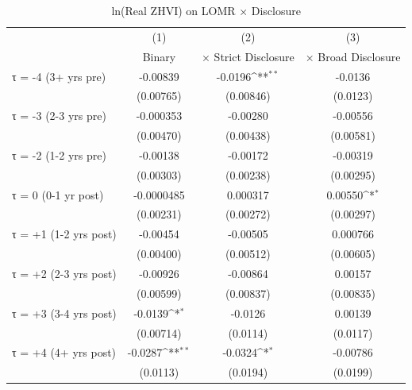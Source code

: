\begin{table}[htbp]\centering\scriptsize
\def\sym#1{\ifmmode^{#1}\else\(^{#1}\)\fi}
\caption{ln(Real ZHVI) on LOMR × Disclosure}
\label{tab:disclosure}
\begin{tabular}{l*{3}{c}}
\hline\hline
                    &\multicolumn{1}{c}{(1)}&\multicolumn{1}{c}{(2)}&\multicolumn{1}{c}{(3)}\\
                    &\multicolumn{1}{c}{Binary}&\multicolumn{1}{c}{× Strict Disclosure}&\multicolumn{1}{c}{× Broad Disclosure}\\
\hline
τ = -4 (3+ yrs pre) &    -0.00839         &     -0.0196\sym{**} &     -0.0136         \\
                    &   (0.00765)         &   (0.00846)         &    (0.0123)         \\
[0.15em]
τ = -3 (2-3 yrs pre)&   -0.000353         &    -0.00280         &    -0.00556         \\
                    &   (0.00470)         &   (0.00438)         &   (0.00581)         \\
[0.15em]
τ = -2 (1-2 yrs pre)&    -0.00138         &    -0.00172         &    -0.00319         \\
                    &   (0.00303)         &   (0.00238)         &   (0.00295)         \\
[0.15em]
τ = 0 (0-1 yr post) &  -0.0000485         &    0.000317         &     0.00550\sym{*}  \\
                    &   (0.00231)         &   (0.00272)         &   (0.00297)         \\
[0.15em]
τ = +1 (1-2 yrs post)&    -0.00454         &    -0.00505         &    0.000766         \\
                    &   (0.00400)         &   (0.00512)         &   (0.00605)         \\
[0.15em]
τ = +2 (2-3 yrs post)&    -0.00926         &    -0.00864         &     0.00157         \\
                    &   (0.00599)         &   (0.00837)         &   (0.00835)         \\
[0.15em]
τ = +3 (3-4 yrs post)&     -0.0139\sym{*}  &     -0.0126         &     0.00139         \\
                    &   (0.00714)         &    (0.0114)         &    (0.0117)         \\
[0.15em]
τ = +4 (4+ yrs post)&     -0.0287\sym{**} &     -0.0324\sym{*}  &    -0.00786         \\
                    &    (0.0113)         &    (0.0194)         &    (0.0199)         \\

\end{tabular}
\end{table}
